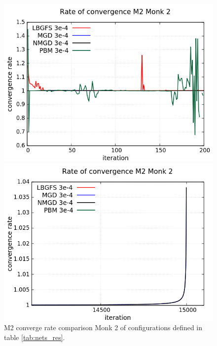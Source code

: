 \begin{figure}[H]
	\centering
	\begin{minipage}[t]{0.525\linewidth}		
		\includegraphics[width=\linewidth]{data/Comparison/Monk2/Monk2_M2_CR_zoomLeft.png}
	\end{minipage}%
	\begin{minipage}[t]{0.525\linewidth}
		\includegraphics[width=\linewidth]{data/Comparison/Monk2/Monk2_M2_CR_zoomRight.png}
	\end{minipage}
	\caption{M2 converge rate comparison Monk 2 of configurations defined in table \ref{tab:nets_res}.}
	\label{fig:CR-M2-Monk2-Zoom}
\end{figure}


